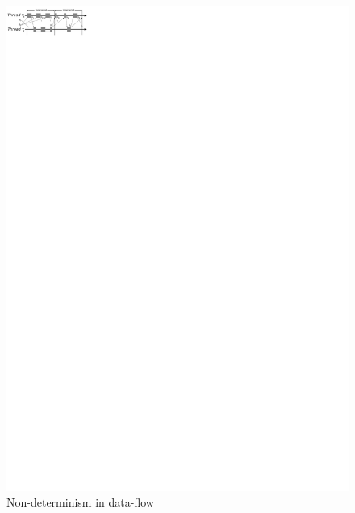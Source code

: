 \begin{figure}
\centering
\includegraphics[scale=1.75]{figs/det_breach1}
\caption{Non-determinism in data-flow}
\label{fig:non_determinism}
\end{figure}

